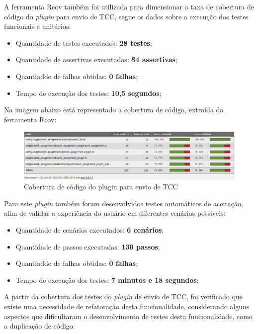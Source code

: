 A ferramenta Rcov também foi utilizada para dimensionar a taxa de cobertura de código do \textit{plugin} para envio de TCC, segue os dados sobre a execução dos testes funcionais e unitários:
\begin{itemize}
\item Quantidade de testes executados: \textbf{28 testes};
\item Quantidade de assertivas executadas: \textbf{84 assertivas};
\item Quantiadde de falhas obtidas: \textbf{0 falhas};
\item Tempo de execução dos testes: \textbf{10,5 segundos};
\end{itemize}

Na imagem abaixo está representado a cobertura de código, extraída da ferramenta Rcov:

\begin{figure}[!h]
    \centering
    \includegraphics[keepaspectratio=false,scale=0.45]
      {figuras/cobertura_tcc.eps}
    \caption{Cobertura de código do plugin para envio de TCC}
    \label{consideracoes_cobertura2}
\end{figure}

Para este \textit{plugin} também foram desenvolvidos testes automáticos de aceitação, afim de validar a experiência do usuário em diferentes cenários possiveis:
\begin{itemize}
\item Quantidade de cenários executados: \textbf{6 cenários};
\item Quantidade de passos executadas: \textbf{130 passos};
\item Quantiadde de falhas obtidas: \textbf{0 falhas};
\item Tempo de execução dos testes: \textbf{7 minutos e 18 segundos};
\end{itemize}

A partir da cobertura dos testes do \textit{plugin} de envio de TCC, foi verificado que existe uma necessidade de refatoração desta funcionalidade, considerando alguns aspectos que dificultaram o desenvolvimento de testes desta funcionalidade, como a duplicação de código.

